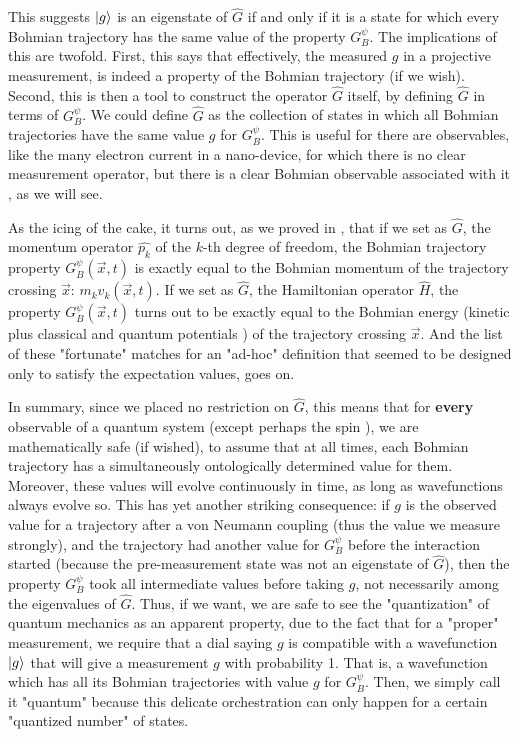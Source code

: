 \documentclass[11pt, a4paper]{article} %
\begin{document}
This suggests $\ket{g}$ is an eigenstate of $\hat{G}$ if and only if it is a state for which every Bohmian trajectory has the same value of the property $G_B^\psi$. The implications of this are twofold. First, this says that effectively, the measured $g$ in a projective measurement, is indeed a property of the Bohmian trajectory (if we wish). Second, this is then a tool to construct the operator $\hat{G}$ itself, by defining $\hat{G}$ in terms of $G^\psi_B$. We could define $\hat{G}$ as the collection of states in which all Bohmian trajectories have the same value $g$ for $G_B^\psi$. This is useful for there are observables, like the many electron current in a nano-device, for which there is no clear measurement operator, but there is a clear Bohmian observable associated with it \cite{Pel, equiv}, as we will see.

As the icing of the cake, it turns out, as we proved in \cite{DevInPosition1}, that if we set as $\hat{G}$, the momentum operator $\hat{p_k}$ of the $k$-th degree of freedom, the Bohmian trajectory property $G^\psi_B(\vec{x},t)$ is exactly equal to the Bohmian momentum of the trajectory crossing $\vec{x}$: $m_k v_k(\vec{x},t)$. If we set as $\hat{G}$, the Hamiltonian operator $\hat{H}$, the property $G^\psi_B(\vec{x},t)$ turns out to be exactly equal to the Bohmian energy (kinetic plus classical and quantum potentials \cite{JordiXavier}) of the trajectory crossing $\vec{x}$. And the list of these "fortunate" matches for an "ad-hoc" definition that seemed to be designed only to satisfy the expectation values, goes on. %

In summary, since we placed no restriction on $\hat{G}$, this means that for {\bf every} observable of a quantum system (except perhaps the spin \cite{spin}), we are mathematically safe (if wished), to assume that at all times, each Bohmian trajectory has a simultaneously ontologically determined value for them. Moreover, these values will evolve continuously in time, as long as wavefunctions always evolve so. This has yet another striking consequence: if $g$ is the observed value for a trajectory after a von Neumann coupling (thus the value we measure strongly), and the trajectory had another value for $G_B^\psi$ before the interaction started (because the pre-measurement state was not an eigenstate of $\hat{G}$), then the property $G_B^\psi$ took all intermediate values before taking $g$, not necessarily among the eigenvalues of $\hat{G}$. Thus, if we want, we are safe to see the "quantization" of quantum mechanics as an apparent property, due to the fact that for a "proper" measurement, we require that a dial saying $g$ is compatible with a wavefunction $\ket{g}$ that will give a measurement $g$ with probability 1. That is, a wavefunction which has all its Bohmian trajectories with value $g$ for $G_B^\psi$. Then, we simply call it "quantum" because this delicate orchestration can only happen for a certain "quantized number" of states.
\end{document}
